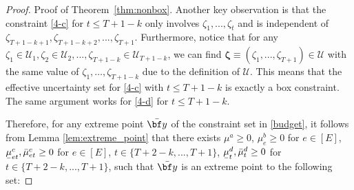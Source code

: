 \documentclass[nonblindrev,mnsc]{informs3} %
\newcommand{\by}{{\bf y}}
\newcommand{\bzeta}{{\boldsymbol{\zeta}}}
\newcommand{\ubar}[1]{\text{\b{$#1$}}}
\begin{document}
\begin{APPENDICES}
\begin{proof}{Proof of Theorem~\ref{thm:nonbox}.}
Another key observation is that the constraint \eqref{4-c} for $t\le T+1-k$ only involves $\zeta_1,...,\zeta_t$ and is independent of $\zeta_{T+1-k+1},\zeta_{T+1-k+2},...,\zeta_{T+1}$. Furthermore, notice that for any $\zeta_1\in \mathcal{U}_1, \zeta_2\in \mathcal{U}_2, ..., \zeta_{T+1-k}\in \mathcal{U}_{T+1-k}$, we can find $\bzeta \equiv (\zeta_1,...,\zeta_{T+1})\in \mathcal{U}$ with the same value of $\zeta_1,\ldots,\zeta_{T+1-k}$ due to the definition of $\mathcal U$. This means that the effective uncertainty set for \eqref{4-c} with $t\le T+1-k$ is exactly a box constraint. The same argument works for \eqref{4-d} for $t\le T+1-k$.

Therefore, for any extreme point $\bar \by$ of the constraint set in \eqref{budget}, it follows from Lemma \ref{lem:extreme_point} that there exists $\mu^a\ge 0$, $\mu^b_e\ge 0$ for $e\in [E]$, $\ubar{\mu}^c_{et}, \bar{\mu}^c_{et}\ge 0$ for $e\in[E]$, $t\in\{T+2-k,...,T+1\}$, $\ubar{\mu}_t^d,\bar{\mu}_t^d\ge 0$ for $t\in \{T+2-k,...,T+1\}$, such that $\bar \by$ is an extreme point to the following set:


\end{proof}
\end{APPENDICES}
\end{document}
